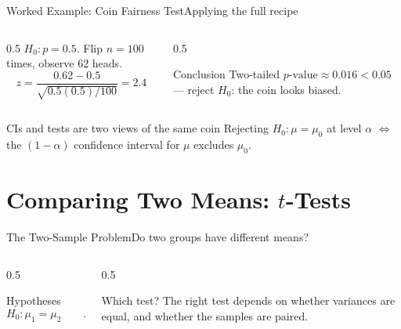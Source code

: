 \documentclass[aspectratio=169,11pt]{beamer}
\begin{document}
\begin{frame}{Worked Example: Coin Fairness Test}{Applying the full recipe}
  \begin{columns}[T]
    \begin{column}{0.5\textwidth}
      \small $H_0: p=0.5$. Flip $n=100$ times, observe $62$ heads.
      \[ z = \frac{0.62-0.5}{\sqrt{0.5(0.5)/100}} = 2.4 \]
    \end{column}
    \begin{column}{0.5\textwidth}
      \begin{exampleblock}{Conclusion}
        \small Two-tailed $p\text{-value} \approx 0.016 < 0.05$ — reject
        $H_0$: the coin looks biased.
      \end{exampleblock}
    \end{column}
  \end{columns}
  \vfill
  \begin{block}{CIs and tests are two views of the same coin}
    \small Rejecting $H_0:\mu=\mu_0$ at level $\alpha$ $\iff$ the
    $(1-\alpha)$ confidence interval for $\mu$ excludes $\mu_0$.
  \end{block}
\end{frame}

\section{Comparing Two Means: $t$-Tests}

\begin{frame}{The Two-Sample Problem}{Do two groups have different means?}
  \begin{columns}[T]
    \begin{column}{0.5\textwidth}
      \begin{block}{Hypotheses}
        \[ H_0: \mu_1=\mu_2 \qquad H_1: \mu_1 \ne \mu_2 \]
      \end{block}
    \end{column}
    \begin{column}{0.5\textwidth}
      \begin{exampleblock}{Which test?}
        \small The right test depends on whether variances are equal, and
        whether the samples are paired.
      \end{exampleblock}
    \end{column}
  \end{columns}
\end{frame}
\end{document}
